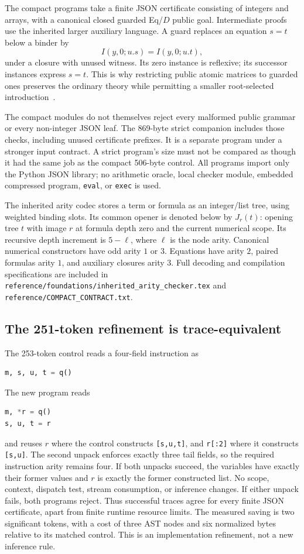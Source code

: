 \documentclass[11pt,letterpaper]{article}
\theoremstyle{definition}
\newcommand{\file}[1]{{\small\nolinkurl{#1}}}
\begin{document}
The compact programs take a finite JSON certificate consisting of integers
and arrays, with a canonical closed guarded Eq/$D$ public goal. Intermediate
proofs use the inherited larger auxiliary language. A guard replaces an
equation $s=t$ below a binder by
\[
I(y,0;u.s)=I(y,0;u.t),
\]
under a closure with unused witness. Its zero instance is reflexive; its
successor instances express $s=t$. This is why restricting public atomic
matrices to guarded ones preserves the ordinary theory while permitting a
smaller root-selected introduction~\cite{public}.

The compact modules do not themselves reject every malformed public
grammar or every non-integer JSON leaf. The 869-byte strict companion
includes those checks, including unused certificate prefixes. It is a
separate program under a stronger input contract. A strict program's size
must not be compared as though it had the same job as the compact
506-byte control. All programs import only the Python JSON library;
no arithmetic oracle, local checker module, embedded compressed program,
\texttt{eval}, or \texttt{exec} is used.

The inherited arity codec stores a term or formula as an integer/list
tree, using weighted binding slots. Its common opener is denoted below by
$J_r(t)$: opening tree $t$ with image $r$ at formula depth zero and the
current numerical scope. Its recursive depth increment is $5-\ell$, where
$\ell$ is the node arity. Canonical numerical constructors have odd arity
$1$ or $3$. Equations have arity $2$, paired formulas arity $1$, and auxiliary
closures arity $3$. Full decoding and compilation specifications are included
in \file{reference/foundations/inherited_arity_checker.tex} and
\file{reference/COMPACT_CONTRACT.txt}.

\subsection{The 251-token refinement is trace-equivalent}

The 253-token control reads a four-field instruction as
\begin{lstlisting}[language=Python]
m, s, u, t = q()
\end{lstlisting}
The new program reads
\begin{lstlisting}[language=Python]
m, *r = q()
s, u, t = r
\end{lstlisting}
and reuses $r$ where the control constructs \texttt{[s,u,t]}, and
\texttt{r[:2]} where it constructs \texttt{[s,u]}.
The second unpack enforces exactly three tail fields, so the required
instruction arity remains four. If both unpacks succeed, the variables
have exactly their former values and $r$ is exactly the former constructed
list. No scope, context, dispatch test, stream consumption, or inference
changes. If either unpack fails, both programs reject. Thus successful
traces agree for every finite JSON certificate, apart from finite runtime
resource limits. The measured saving is two significant tokens, with a
cost of three AST nodes and six normalized bytes relative to its matched
control. This is an implementation refinement, not a new inference rule.
\end{document}
